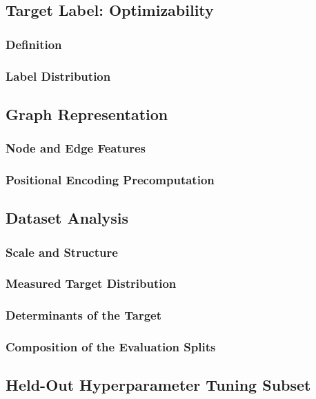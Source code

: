 \subsection{Target Label: Optimizability}
\label{sec:method:data:label}

\subsubsection{Definition}
\label{sec:method:data:label:definition}

\subsubsection{Label Distribution}
\label{sec:method:data:label:distribution}

\subsection{Graph Representation}
\label{sec:method:data:representation}

\subsubsection{Node and Edge Features}
\label{sec:method:data:representation:features}

\subsubsection{Positional Encoding Precomputation}
\label{sec:method:data:representation:pe}

\subsection{Dataset Analysis}
\label{sec:method:data:statistics}

\subsubsection{Scale and Structure}
\label{sec:method:data:statistics:scale}

\subsubsection{Measured Target Distribution}
\label{sec:method:data:statistics:label}

\subsubsection{Determinants of the Target}
\label{sec:method:data:statistics:source}

\subsubsection{Composition of the Evaluation Splits}
\label{sec:method:data:statistics:splits}

\subsection{Held-Out Hyperparameter Tuning Subset}
\label{sec:method:data:hpsubset}
